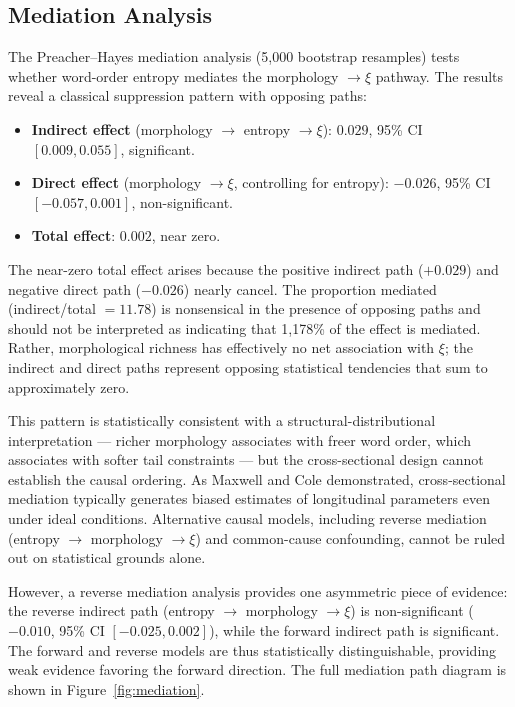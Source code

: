 \documentclass[11pt,letterpaper]{article}
\begin{document}
\subsection{Mediation Analysis}

The Preacher--Hayes mediation analysis (5,000 bootstrap resamples) tests whether word-order entropy mediates the morphology $\rightarrow \xi$ pathway. The results reveal a classical suppression pattern with opposing paths:

\begin{itemize}
  \item \textbf{Indirect effect} (morphology $\rightarrow$ entropy $\rightarrow \xi$): $0.029$, 95\% CI $[0.009, 0.055]$, significant.
  \item \textbf{Direct effect} (morphology $\rightarrow \xi$, controlling for entropy): $-0.026$, 95\% CI $[-0.057, 0.001]$, non-significant.
  \item \textbf{Total effect}: $0.002$, near zero.
\end{itemize}

The near-zero total effect arises because the positive indirect path ($+0.029$) and negative direct path ($-0.026$) nearly cancel. The proportion mediated (indirect/total $= 11.78$) is nonsensical in the presence of opposing paths and should not be interpreted as indicating that 1,178\% of the effect is mediated. Rather, morphological richness has effectively no net association with $\xi$; the indirect and direct paths represent opposing statistical tendencies that sum to approximately zero.

This pattern is statistically consistent with a structural-distributional interpretation --- richer morphology associates with freer word order, which associates with softer tail constraints --- but the cross-sectional design cannot establish the causal ordering. As Maxwell and Cole \cite{Maxwell2007} demonstrated, cross-sectional mediation typically generates biased estimates of longitudinal parameters even under ideal conditions. Alternative causal models, including reverse mediation (entropy $\rightarrow$ morphology $\rightarrow \xi$) and common-cause confounding, cannot be ruled out on statistical grounds alone.

However, a reverse mediation analysis provides one asymmetric piece of evidence: the reverse indirect path (entropy $\rightarrow$ morphology $\rightarrow \xi$) is non-significant ($-0.010$, 95\% CI $[-0.025, 0.002]$), while the forward indirect path is significant. The forward and reverse models are thus statistically distinguishable, providing weak evidence favoring the forward direction. The full mediation path diagram is shown in Figure~\ref{fig:mediation}.
\end{document}
